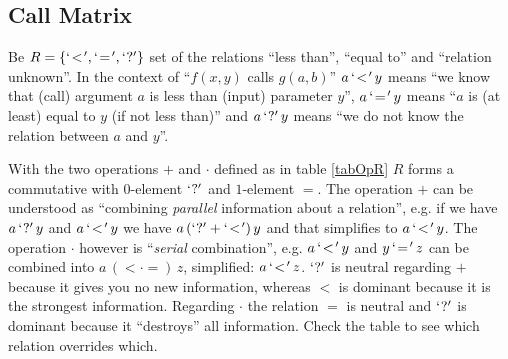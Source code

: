 

\subsection{Call Matrix}
Be $R = \{`\!<\!', `\!=\!', `?'\}$ set of the relations ``less
than'',  ``equal to'' and ``relation unknown''. In the context of
``$f(x,y)$ calls $g(a,b)$'' $a \,`\!<\!'\, y$ means ``we know that (call)
argument $a$ is less than (input) parameter $y$'', $a \,`\!=\!'\, y$ means
``$a$ is (at least) equal to $y$ (if not less than)'' and $a \,`?'\,
y$ means ``we do not know the relation between $a$ and $y$''.

With the two operations
$+$ and $\cdot$ defined as in table \ref{tabOpR} $R$ forms a
commutative
with $0$-element $`?'$ and $1$-element $\equal$. The operation $+$ can be
understood as ``combining {\em parallel} information about a relation'',
e.g. if we have $a \,`?'\, y$ and $a \,`\!<\!'\, y$ we have $a
\,(`?' + `\!<\!')\, y$ and that simplifies to $a \,`\!<\!'\, y$.
The operation
$\cdot$ however is ``{\em serial} combination'', e.g. $a \,`\!<\!'\, y$
and $y \,`\!=\!'\, z$ can be combined into $a \,(\less \cdot \equal)\, z$,
simplified: $a \,`\!<\!'\, z$. $`?'$ is neutral regarding $+$ because
it gives you no new information, whereas $\less$ is dominant because
it is the strongest information. Regarding $\cdot$ the relation
$\equal$ is neutral
and $`?'$ is dominant because it ``destroys'' all
information. Check the table to see which relation overrides which.

